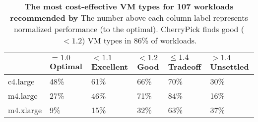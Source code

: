 \begin{table}[!htbp]
\centering
\caption{\textbf{The most cost-effective VM types  for 107 workloads recommended by \micky} The number above each column label represents normalized performance (to the optimal). CherryPick finds good ($< 1.2$) VM types in 86\% of workloads.}
\label{table:top3}
\begin{tabular}{@{}lp{2cm}p{2cm}p{2cm}p{2cm}p{2cm}@{}}
\toprule
& $= 1.0$ \newline \textbf{Optimal}   & $< 1.1$ \newline \textbf{Excellent} & $< 1.2$ \newline \textbf{Good} & $\le 1.4$ \newline \textbf{Tradeoff} & $> 1.4$ \newline \textbf{Unsettled}     \\ \midrule
c4.large  & 48\%      & 61\% & 66\%      & 70\%        & 30\% \\
m4.large  & 27\%      & 46\% & 71\%      & 84\%        & 16\% \\
m4.xlarge & 9\%       & 15\% & 32\%      & 63\%        & 37\% \\ \bottomrule
\end{tabular}
\end{table}
